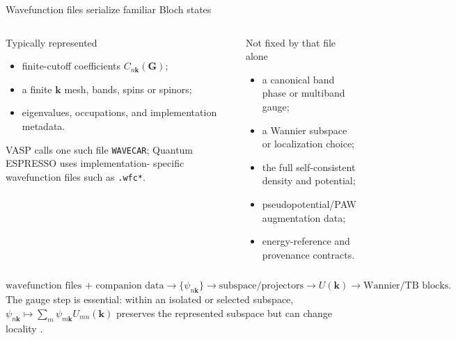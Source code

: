 \documentclass[aspectratio=169,10pt]{beamer}
\begin{document}
\begin{frame}{Wavefunction files serialize familiar Bloch states}
  \small
  \begin{columns}[T]
      \begin{block}{Typically represented}
        \begin{itemize}
          \item finite-cutoff coefficients $C_{n\mathbf k}(\mathbf G)$;
          \item a finite $\mathbf k$ mesh, bands, spins or spinors;
          \item eigenvalues, occupations, and implementation metadata.
        \end{itemize}
        VASP calls one such file \texttt{WAVECAR}; Quantum ESPRESSO uses implementation-
        specific wavefunction files such as \texttt{.wfc*}.
      \end{block}
      \begin{alertblock}{Not fixed by that file alone}
        \begin{itemize}
          \item a canonical band phase or multiband gauge;
          \item a Wannier subspace or localization choice;
          \item the full self-consistent density and potential;
          \item pseudopotential/PAW augmentation data;
          \item energy-reference and provenance contracts.
        \end{itemize}
      \end{alertblock}
  \end{columns}

  \[
    \text{wavefunction files + companion data}
    \rightarrow \{\psi_{n\mathbf k}\}
    \rightarrow \text{subspace/projectors}
    \rightarrow U(\mathbf k)
    \rightarrow \text{Wannier/TB blocks}.
  \]
  The gauge step is essential: within an isolated or selected subspace,
  $\psi_{n\mathbf k}\mapsto\sum_m\psi_{m\mathbf k}U_{mn}(\mathbf k)$ preserves the
  represented subspace but can change locality \cite{marzari2012,pizzi2020}.
\end{frame}
\end{document}
